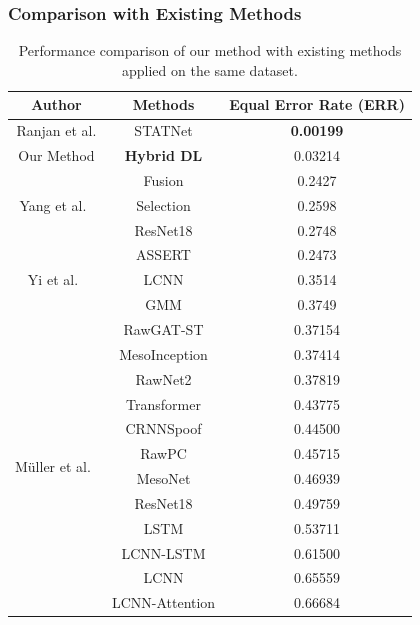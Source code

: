 \documentclass{article}
\begin{document}
\subsubsection{Comparison with Existing Methods}
\begin{table}
    \caption{Performance comparison of our method with existing methods applied on the same dataset.}
    \vspace{10pt}
    \centering
    \begin{tabular}{|c|c | c|}
        \hline
        \textbf{Author} & \textbf{Methods} & \textbf{Equal Error Rate (ERR)} \\ \hline
        Ranjan et al.\cite{ranjan_statnet_2022} & STATNet  & \textbf{0.00199} \\ \hline
        Our Method &\textbf{Hybrid DL} & 0.03214 \\  \hline
        \multirow{3}{*}{Yang et al.~\cite{yang_robust_2024}} &	Fusion & 0.2427 \\ \cline{2-3}
        &	Selection  & 0.2598 \\ \cline{2-3}
        &	ResNet18  & 0.2748 \\ \hline
        
        \multirow{3}{*}{Yi et al.~\cite{yi_audio_2023}}    &	ASSERT  & 0.2473 \\ \cline{2-3}
        &	LCNN  & 0.3514 \\ \cline{2-3}
        &	GMM & 0.3749 \\ \hline

        \multirow{12}{*}{Müller et al.~\cite{muller_does_2022}} 
        &	RawGAT-ST \cite{muller_does_2022} & 0.37154 \\ \cline{2-3}
        &	MesoInception \cite{muller_does_2022} & 0.37414 \\ \cline{2-3}        
        &	RawNet2  & 0.37819 \\ \cline{2-3}
        &	Transformer  & 0.43775 \\ \cline{2-3}
        &	CRNNSpoof & 0.44500 \\ \cline{2-3}
        &	RawPC  & 0.45715 \\ \cline{2-3}
        &	MesoNet & 0.46939 \\ \cline{2-3}
        &	ResNet18  & 0.49759 \\ \cline{2-3}
        &	LSTM  & 0.53711 \\ \cline{2-3}
        &	LCNN-LSTM  & 0.61500 \\ \cline{2-3}
        &	LCNN  & 0.65559 \\ \cline{2-3}
        &	LCNN-Attention  & 0.66684 \\ \hline
    \end{tabular}
    \label{table:other_results}
\end{table}
\end{document}
